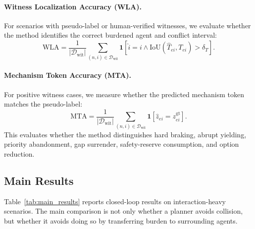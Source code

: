 \documentclass[10pt]{article}
\begin{document}
\paragraph{Witness Localization Accuracy (WLA).}
For scenarios with pseudo-label or human-verified witnesses, we evaluate whether the method identifies the correct burdened agent and conflict interval:
\begin{equation}
    \mathrm{WLA}
    =
    \frac{1}{|\mathcal{D}_{\mathrm{wit}}|}
    \sum_{(n,i)\in\mathcal{D}_{\mathrm{wit}}}
    \mathbf{1}
    [
    \widehat{i}=i
    \wedge
    \mathrm{IoU}(\widehat{T}_{ei},T_{ei})>\delta_T
    ].
\end{equation}

\paragraph{Mechanism Token Accuracy (MTA).}
For positive witness cases, we measure whether the predicted mechanism token matches the pseudo-label:
\begin{equation}
    \mathrm{MTA}
    =
    \frac{1}{|\mathcal{D}_{\mathrm{wit}}|}
    \sum_{(n,i)\in\mathcal{D}_{\mathrm{wit}}}
    \mathbf{1}
    [
    \widehat{z}_{ei}=z^{\mathrm{gt}}_{ei}
    ].
\end{equation}
This evaluates whether the method distinguishes hard braking, abrupt yielding, priority abandonment, gap surrender, safety-reserve consumption, and option reduction.

\subsection{Main Results}
\label{sec:main_results}

Table~\ref{tab:main_results} reports closed-loop results on interaction-heavy scenarios. The main comparison is not only whether a planner avoids collision, but whether it avoids doing so by transferring burden to surrounding agents.
\end{document}
